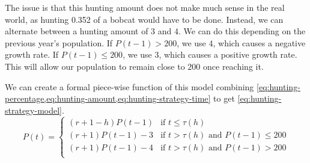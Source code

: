 \documentclass{article}
\begin{document}
The issue is that this hunting amount does not make much sense in the real world, as hunting 0.352 of a bobcat would have to be done. Instead, we can alternate between a hunting amount of $3$ and $4$. We can do this depending on the previous year's population. If $P(t-1) > 200$, we use $4$, which causes a negative growth rate. If $P(t-1) \le 200$, we use $3$, which causes a positive growth rate. This will allow our population to remain close to $200$ once reaching it.

We can create a formal piece-wise function of this model combining \cref{eq:hunting-percentage,eq:hunting-amount,eq:hunting-strategy-time} to get \cref{eq:hunting-strategy-model}.
\begin{equation}\label{eq:hunting-strategy-model}
P(t) =
    \begin{cases}
        (r+1-h)P(t-1)  & \text{if } t \le \tau(h) \\
        (r+1)P(t-1) - 3& \text{if } t > \tau(h) \text{ and } P(t-1) \le 200 \\
        (r+1)P(t-1) - 4& \text{if } t > \tau(h) \text{ and } P(t-1) > 200 \\
    \end{cases}
\end{equation}
\end{document}

